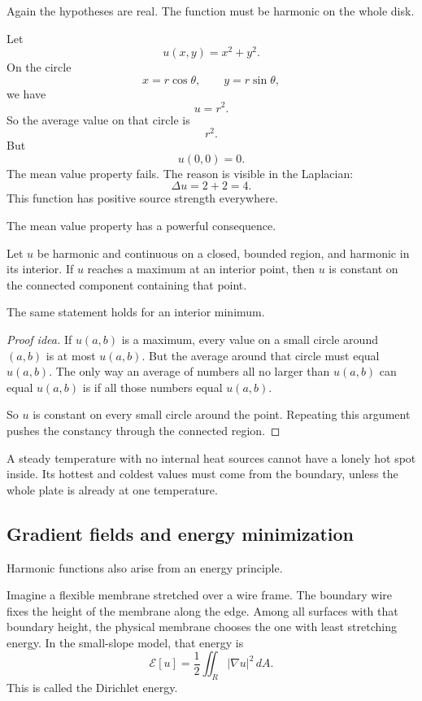 Again the hypotheses are real.  The function must be harmonic on the whole disk.

\begin{example}
Let
\[
    u(x,y)=x^2+y^2.
\]
On the circle
\[
    x=r\cos\theta,\qquad y=r\sin\theta,
\]
we have
\[
    u=r^2.
\]
So the average value on that circle is
\[
    r^2.
\]
But
\[
    u(0,0)=0.
\]
The mean value property fails.  The reason is visible in the Laplacian:
\[
    \Delta u=2+2=4.
\]
This function has positive source strength everywhere.
\end{example}

The mean value property has a powerful consequence.

\begin{theorem}
Let \(u\) be harmonic and continuous on a closed, bounded region, and harmonic in its
interior.  If \(u\) reaches a maximum at an interior point, then \(u\) is constant on the
connected component containing that point.

The same statement holds for an interior minimum.
\end{theorem}

\begin{proof}[Proof idea]
If \(u(a,b)\) is a maximum, every value on a small circle around \((a,b)\) is at most
\(u(a,b)\).  But the average around that circle must equal \(u(a,b)\).  The only way an
average of numbers all no larger than \(u(a,b)\) can equal \(u(a,b)\) is if all those
numbers equal \(u(a,b)\).

So \(u\) is constant on every small circle around the point.  Repeating this argument
pushes the constancy through the connected region.
\end{proof}

A steady temperature with no internal heat sources cannot have a lonely hot spot inside.
Its hottest and coldest values must come from the boundary, unless the whole plate is
already at one temperature.

\subsection{Gradient fields and energy minimization}

Harmonic functions also arise from an energy principle.

Imagine a flexible membrane stretched over a wire frame.  The boundary wire fixes the
height of the membrane along the edge.  Among all surfaces with that boundary height,
the physical membrane chooses the one with least stretching energy.  In the small-slope
model, that energy is
\[
\boxed{
    \mathcal E[u]
    =
    \frac12\iint_R |\nabla u|^2\,dA.
}
\]
This is called the Dirichlet energy.

